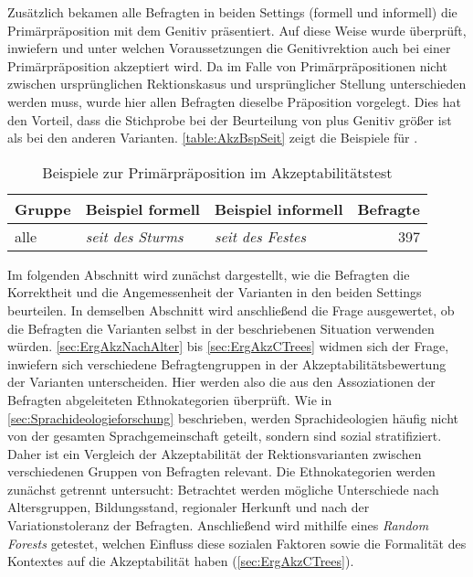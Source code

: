 Zusätzlich bekamen alle Befragten in beiden Settings (formell und informell) die Primärpräposition  mit dem Genitiv präsentiert.
Auf diese Weise wurde überprüft, inwiefern und unter welchen Voraussetzungen die Genitivrektion auch bei einer Primärpräposition akzeptiert wird. 
Da im Falle von Primärpräpositionen nicht zwischen ursprünglichen Rektionskasus und ursprünglicher Stellung unterschieden werden muss, wurde hier allen Befragten dieselbe Präposition vorgelegt. 
Dies hat den Vorteil, dass die Stichprobe bei der Beurteilung von  plus Genitiv größer ist als bei den anderen Varianten.
\autoref{table:AkzBspSeit} zeigt die Beispiele für . 
\begin{table}
\centering
\begin{tabular}{lllr}
\textbf{Gruppe } & \textbf{ Beispiel formell }              & \textbf{ Beispiel informell }       & \textbf{ Befragte} \\ \hline
alle               & \textit{ seit des Sturms} & \textit{ seit des Festes}         &          397         \\ 
\end{tabular}
\caption{Beispiele zur Primärpräposition  im Akzeptabilitätstest}
\label{table:AkzBspSeit}
\end{table}

Im folgenden Abschnitt wird zunächst dargestellt, wie die Befragten die Korrektheit und die Angemessenheit der Varianten in den beiden Settings beurteilen. 
In demselben Abschnitt wird anschließend die Frage ausgewertet, ob die Befragten die Varianten selbst in der beschriebenen Situation verwenden würden. 
\autoref{sec:ErgAkzNachAlter} bis \autoref{sec:ErgAkzCTrees} widmen sich der Frage, inwiefern sich verschiedene Befragtengruppen in der Akzeptabilitätsbewertung der Varianten unterscheiden.
Hier werden also die aus den Assoziationen der Befragten abgeleiteten Ethnokategorien überprüft. 
Wie in \autoref{sec:Sprachideologieforschung} beschrieben, werden Sprachideologien häufig nicht von der gesamten Sprachgemeinschaft geteilt, sondern sind sozial stratifiziert.
Daher ist ein Vergleich der Akzeptabilität der Rektionsvarianten zwischen verschiedenen Gruppen von Befragten relevant. 
Die Ethnokategorien werden zunächst getrennt untersucht: 
Betrachtet werden mögliche Unterschiede nach Altersgruppen, Bildungsstand, regionaler Herkunft und nach der Variationstoleranz der Befragten. 
Anschließend wird mithilfe eines \textit{Random Forests} \citep[s.][297--299]{Levshina.2015} getestet, welchen Einfluss diese sozialen Faktoren sowie die Formalität des Kontextes auf die Akzeptabilität haben (\autoref{sec:ErgAkzCTrees}). 

